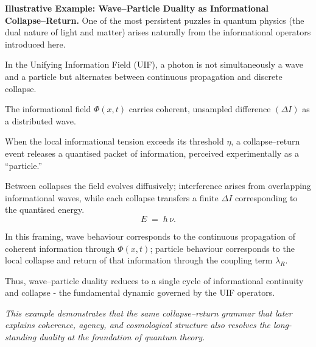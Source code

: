 \noindent\textbf {Illustrative Example: Wave–Particle Duality as Informational Collapse–Return.}
\newline One of the most persistent puzzles in quantum physics (the dual nature of light and matter) arises naturally from the informational operators introduced here.
\newline

\noindent In the Unifying Information Field (UIF), a photon is not simultaneously a wave and a particle but alternates between continuous propagation and discrete collapse. 
\newline


\noindent The informational field $\Phi(x,t)$ carries coherent, unsampled difference $(\Delta I)$ as a distributed wave.
\newline

\noindent When the local informational tension exceeds its threshold $\eta$, a collapse–return event releases a quantised packet of information, perceived experimentally as a “particle.”
\newline

\noindent Between collapses the field evolves diffusively; interference arises from overlapping informational waves, while each collapse transfers a finite $\Delta I$ corresponding to the quantised energy.
\begin{equation}
\label{eq:618}
E \;=\; h\, \nu.
\end{equation}

\noindent In this framing, wave behaviour corresponds to the continuous propagation of coherent information through $\Phi(x,t)$; particle behaviour corresponds to the local collapse and return of that information through the coupling term $\lambda_R$.
\newline 

\noindent Thus, wave–particle duality reduces to a single cycle of informational continuity and collapse - the fundamental dynamic governed by the UIF operators.
\newline 


\noindent  \textit{This example demonstrates that the same collapse–return grammar that later explains coherence, agency, and cosmological structure also resolves the long-standing duality at the foundation of quantum theory.}
\newline


